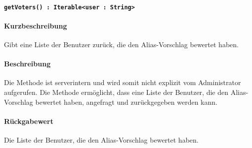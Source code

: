 \paragraph{\texttt{getVoters() : Iterable<user : String>}}%
\paragraph*{Kurzbeschreibung}
Gibt eine Liste der Benutzer zurück, die den Alias-Vorschlag bewertet haben.
\paragraph*{Beschreibung}
Die Methode ist serverintern und wird somit nicht explizit vom Administrator aufgerufen.
Die Methode ermöglicht, dass eine Liste der Benutzer, die den Alias-Vorschlag bewertet haben, angefragt und zurückgegeben werden kann.
\paragraph*{Rückgabewert}
Die Liste der Benutzer, die den Alias-Vorschlag bewertet haben.
